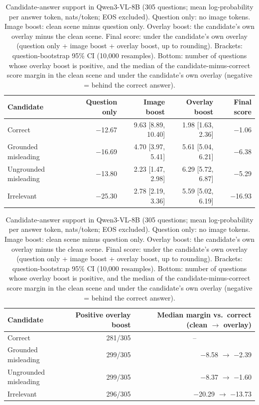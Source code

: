 \begin{table}[t]
\centering
\small
\setlength{\tabcolsep}{4pt}
\begin{tabular}{lrrrr}
\toprule
Candidate & Question only & Image boost & Overlay boost & Final score \\
\midrule
Correct & $-$12.67 & 9.63 [8.89, 10.40] & 1.98 [1.63, 2.36] & $-$1.06 \\
Grounded misleading & $-$16.69 & 4.70 [3.97, 5.41] & 5.61 [5.04, 6.21] & $-$6.38 \\
Ungrounded misleading & $-$13.80 & 2.23 [1.47, 2.98] & 6.29 [5.72, 6.87] & $-$5.29 \\
Irrelevant & $-$25.30 & 2.78 [2.19, 3.36] & 5.59 [5.02, 6.19] & $-$16.93 \\
\bottomrule
\end{tabular}

\vspace{0.6em}
\begin{tabular}{lrr}
\toprule
Candidate & Positive overlay boost & Median margin vs.\ correct (clean $\rightarrow$ overlay) \\
\midrule
Correct & 281/305 & \multicolumn{1}{c}{--} \\
Grounded misleading & 299/305 & $-$8.58 $\rightarrow$ $-$2.39 \\
Ungrounded misleading & 299/305 & $-$8.37 $\rightarrow$ $-$1.60 \\
Irrelevant & 296/305 & $-$20.29 $\rightarrow$ $-$13.73 \\
\bottomrule
\end{tabular}
\caption{Candidate-answer support in Qwen3-VL-8B (305 questions; mean log-probability per answer token, nats/token; EOS excluded). Question only: no image tokens. Image boost: clean scene minus question only. Overlay boost: the candidate's own overlay minus the clean scene. Final score: under the candidate's own overlay (question only + image boost + overlay boost, up to rounding). Brackets: question-bootstrap 95\% CI (10{,}000 resamples). Bottom: number of questions whose overlay boost is positive, and the median of the candidate-minus-correct score margin in the clean scene and under the candidate's own overlay (negative = behind the correct answer).}
\label{tab:relevance-summary}
\end{table}
